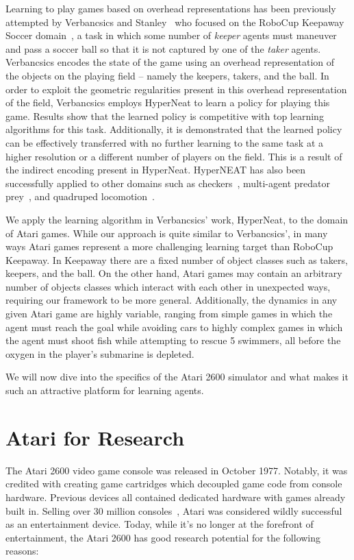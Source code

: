 \documentclass{acm_proc_article-sp}
\begin{document}
Learning to play games based on overhead representations has been previously attempted by Verbancsics and Stanley~\cite{verbancsics10} who focused on the RoboCup Keepaway Soccer domain~\cite{stone01}, a task in which some number of \textit{keeper} agents must maneuver and pass a soccer ball so that it is not captured by one of the \textit{taker} agents. Verbancsics encodes the state of the game using an overhead representation of the objects on the playing field -- namely the keepers, takers, and the ball. In order to exploit the geometric regularities present in this overhead representation of the field, Verbancsics employs HyperNeat to learn a policy for playing this game. Results show that the learned policy is competitive with top learning algorithms for this task. Additionally, it is demonstrated that the learned policy can be effectively transferred with no further learning to the same task at a higher resolution or a different number of players on the field. This is a result of the indirect encoding present in HyperNeat. HyperNEAT has also been successfully applied to other domains such as checkers~\cite{gauci08}, multi-agent predator prey~\cite{ambrosio08}, and quadruped locomotion~\cite{clune09}. 

We apply the learning algorithm in Verbancsics' work, HyperNeat, to the domain of Atari games. While our approach is quite similar to Verbancsics', in many ways Atari games represent a more challenging learning target than RoboCup Keepaway. In Keepaway there are a fixed number of object classes such as takers, keepers, and the ball. On the other hand, Atari games may contain an arbitrary number of objects classes which interact with each other in unexpected ways, requiring our framework to be more general. Additionally, the dynamics in any given Atari game are highly variable, ranging from simple games in which the agent must reach the goal while avoiding cars to highly complex games in which the agent must shoot fish while attempting to rescue 5 swimmers, all before the oxygen in the player's submarine is depleted.

We will now dive into the specifics of the Atari 2600 simulator and what makes it such an attractive platform for learning agents.

\section{Atari for Research}
\label{sec:atari}
The Atari 2600 video game console was released in October 1977. Notably, it was credited with creating game cartridges which decoupled game code from console hardware. Previous devices all contained dedicated hardware with games already built in. Selling over 30 million consoles~\cite{atarihist}, Atari was considered wildly successful as an entertainment device. Today, while it's no longer at the forefront of entertainment, the Atari 2600 has good research potential for the following reasons:
\end{document}
